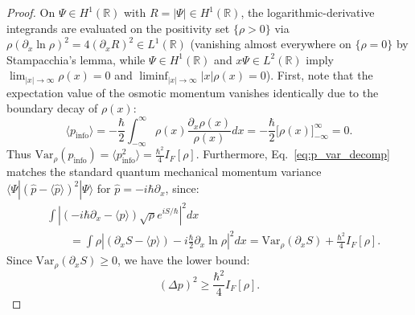 \documentclass[11pt, a4paper]{article}
\theoremstyle{definition}
\begin{document}
\begin{proof}
On $\Psi \in H^1(\mathbb{R})$ with $R = |\Psi| \in H^1(\mathbb{R})$, the logarithmic-derivative integrands are evaluated on the positivity set $\{\rho > 0\}$ via $\rho(\partial_x\ln\rho)^2 = 4(\partial_x R)^2 \in L^1(\mathbb{R})$ (vanishing almost everywhere on $\{\rho = 0\}$ by Stampacchia's lemma, while $\Psi \in H^1(\mathbb{R})$ and $x\Psi \in L^2(\mathbb{R})$ imply $\lim_{|x|\to\infty}\rho(x) = 0$ and $\liminf_{|x|\to\infty}|x|\rho(x) = 0$). First, note that the expectation value of the osmotic momentum vanishes identically due to the boundary decay of $\rho(x)$:
\begin{equation}
\langle p_{\text{info}} \rangle = -\frac{\hbar}{2} \int_{-\infty}^{\infty} \rho(x) \frac{\partial_x \rho(x)}{\rho(x)} dx = -\frac{\hbar}{2} \Big[ \rho(x) \Big]_{-\infty}^{\infty} = 0.
\end{equation}
Thus $\text{Var}_\rho(p_{\text{info}}) = \langle p_{\text{info}}^2 \rangle = \frac{\hbar^2}{4} I_F[\rho]$. Furthermore, Eq.~\eqref{eq:p_var_decomp} matches the standard quantum mechanical momentum variance $\langle \Psi | (\hat{p} - \langle \hat{p} \rangle)^2 | \Psi \rangle$ for $\hat{p} = -i\hbar\partial_x$, since:
\begin{equation}
\begin{aligned}
&\int \left|\left(-i\hbar\partial_x - \langle p \rangle\right)\sqrt{\rho}e^{iS/\hbar}\right|^2 dx \\
&\qquad = \int \rho \left| (\partial_x S - \langle p \rangle) - i\frac{\hbar}{2}\partial_x \ln\rho \right|^2 dx = \text{Var}_\rho(\partial_x S) + \frac{\hbar^2}{4}I_F[\rho].
\end{aligned}
\end{equation}
Since $\text{Var}_\rho(\partial_x S) \ge 0$, we have the lower bound:
\begin{equation}
\label{eq:p_fisher_bound}
(\Delta p)^2 \ge \frac{\hbar^2}{4} I_F[\rho].
\end{equation}


\end{proof}
\end{document}
